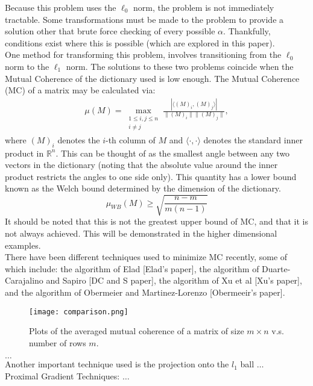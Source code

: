 \documentclass[journal]{IEEEtran}
\begin{document}
Because this problem uses the $\ell_0$ norm, the problem is not immediately tractable. Some transformations
must be made to the problem to provide a solution other that brute force checking of every possible
$\alpha$. Thankfully, conditions exist where this is possible (which are explored in this paper). \\
One method for transforming this problem, involves transitioning from the $\ell_0$ norm to the $\ell_1$ norm.
The solutions to these two problems coincide when the Mutual Coherence of the dictionary used is low 
enough. The Mutual Coherence (MC) of a matrix may be calculated via:
\begin{align}
\mu(M)=\max\limits_{\substack{1\leq i,j \leq n \\ i\neq j}}\frac{|\langle (M)_i, (M)_j \rangle |}{\|(M)_i\| \|(M)_j\|},
\end{align}
where $ (M)_i$ denotes the $i$-th column of $M$ and $\langle\cdot , \cdot \rangle $ denotes the standard inner product in $\mathbb{R}^n$. 
This can be thought of as the smallest angle between any two vectors in the dictionary (noting that
the absolute value around the inner product restricts the angles to one side only). This quantity
has a lower bound known as the Welch bound determined by the dimension of the dictionary.
\begin{equation}
\mu_{WB}(M) \geq \sqrt{\frac{n - m}{m(n-1)}}
\end{equation}
It should be noted that this is not the greatest upper bound of MC, and that it is not always
achieved. This will be demonstrated in the higher dimensional examples. \\
There have been different techniques used to minimize MC recently, some of which include: the algorithm of Elad [Elad's paper], the algorithm of Duarte-Carajalino and Sapiro [DC and S paper], the algorithm of Xu et al [Xu's paper], and the algorithm of Obermeier and Martinez-Lorenzo [Obermeeir's paper]. 
\begin{figure}[!h]
\centering
\texttt{[image: comparison.png]}
\caption{Plots of the averaged mutual coherence of a matrix of size $m \times n$ v.s. number of rows $m$.}
\label{Fig:comp_of_algtms}
\end{figure}



$\ldots$ \\
Another important technique used is the projection onto the $l_1$ ball $\ldots$\\
Proximal Gradient Techniques: $\ldots$
\end{document}
